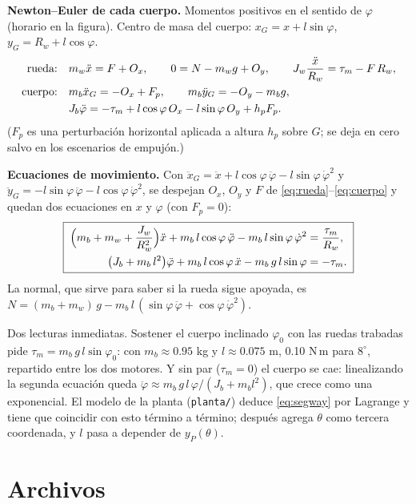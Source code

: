 \documentclass[11pt,a4paper]{article}
\begin{document}
\textbf{Newton--Euler de cada cuerpo.} Momentos positivos en el sentido de \(\varphi\) (horario en la
figura). Centro de masa del cuerpo: \(x_G=x+l\sin\varphi\), \(y_G=R_w+l\cos\varphi\).
\begin{align}
\text{rueda:}&\quad m_w\ddot x=F+O_x,\qquad 0=N-m_wg+O_y,\qquad J_w\frac{\ddot x}{R_w}=\tau_m-F\,R_w, \label{eq:rueda}\\
\text{cuerpo:}&\quad m_b\ddot x_G=-O_x+F_p,\qquad m_b\ddot y_G=-O_y-m_bg, \notag\\
&\quad J_b\ddot\varphi=-\tau_m+l\cos\varphi\,O_x-l\sin\varphi\,O_y+h_pF_p. \label{eq:cuerpo}
\end{align}
(\(F_p\) es una perturbación horizontal aplicada a altura \(h_p\) sobre \(G\); se deja en cero salvo en los
escenarios de empujón.)

\textbf{Ecuaciones de movimiento.} Con \(\ddot x_G=\ddot x+l\cos\varphi\,\ddot\varphi-l\sin\varphi\,\dot\varphi^2\)
y \(\ddot y_G=-l\sin\varphi\,\ddot\varphi-l\cos\varphi\,\dot\varphi^2\), se despejan \(O_x\), \(O_y\) y \(F\)
de \eqref{eq:rueda}--\eqref{eq:cuerpo} y quedan dos ecuaciones en \(x\) y \(\varphi\) (con \(F_p=0\)):
\begin{equation}
\boxed{\;
\begin{aligned}
\Bigl(m_b+m_w+\frac{J_w}{R_w^2}\Bigr)\ddot x+m_b\,l\cos\varphi\,\ddot\varphi-m_b\,l\sin\varphi\,\dot\varphi^2&=\frac{\tau_m}{R_w},\\
\bigl(J_b+m_b\,l^2\bigr)\ddot\varphi+m_b\,l\cos\varphi\,\ddot x-m_b\,g\,l\sin\varphi&=-\tau_m .
\end{aligned}
\;}
\label{eq:segway}
\end{equation}
La normal, que sirve para saber si la rueda sigue apoyada, es
\(N=(m_b+m_w)\,g-m_b\,l\,(\sin\varphi\,\ddot\varphi+\cos\varphi\,\dot\varphi^2)\).

Dos lecturas inmediatas. Sostener el cuerpo inclinado \(\varphi_0\) con las ruedas trabadas pide
\(\tau_m=m_b\,g\,l\sin\varphi_0\): con \(m_b\approx0.95\) kg y \(l\approx0.075\) m, 0.10 N\,m para \(8^\circ\),
repartido entre los dos motores. Y sin par (\(\tau_m=0\)) el cuerpo se cae: linealizando la segunda ecuación
queda \(\ddot\varphi\approx m_b\,g\,l\,\varphi/(J_b+m_b l^2)\), que crece como una exponencial. El modelo de
la planta (\texttt{planta/}) deduce \eqref{eq:segway} por Lagrange y tiene que coincidir con esto término a
término; después agrega \(\theta\) como tercera coordenada, y \(l\) pasa a depender de \(y_P(\theta)\).

\section{Archivos}
\end{document}
